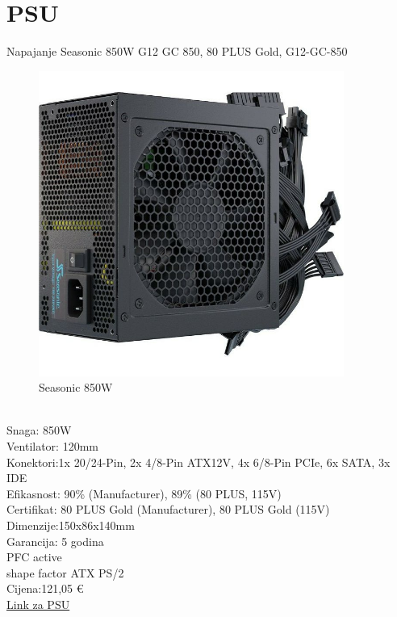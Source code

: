 \documentclass{article}
\begin{document}
\section{PSU}
Napajanje Seasonic 850W G12 GC 850, 80 PLUS Gold, G12-GC-850
\begin{figure}[h]
    \includegraphics[width=10cm]{psu.jpg}
    \caption{Seasonic 850W}
\end{figure}\\
Snaga: 850W\\
Ventilator: 120mm\\
Konektori:1x 20/24-Pin, 2x 4/8-Pin ATX12V, 4x 6/8-Pin PCIe, 6x SATA, 3x IDE\\
Efikasnost: 90\% (Manufacturer), 89\% (80 PLUS, 115V)\\
Certifikat: 80 PLUS Gold (Manufacturer), 80 PLUS Gold (115V)\\
Dimenzije:150x86x140mm\\
Garancija: 5 godina\\
PFC active\\
shape factor ATX PS/2\\
Cijena:121,05 €\\
\href{https://www.adm.hr/napajanje-seasonic-core-g12-gc-850w-80-plus-gold-g12-gc-850/70724/product/}{Link za PSU}
\newpage
\end{document}
